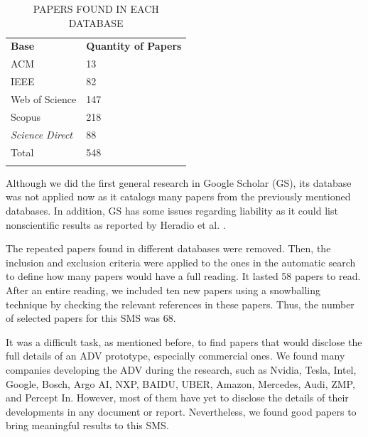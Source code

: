 \documentclass[lettersize,journal]{IEEEtran}
\begin{document}
\begin{table}[!ht]
  \centering
  \captionsetup{
    format=hang, %
    justification=raggedright,
    singlelinecheck=false,
    skip=9pt, %
  }
  \caption{\MakeUppercase{Papers found in each database}}
  \label{table:qtd_artigos}
  \def\arraystretch{1.5}
  \begin{tabularx}{\textwidth}{>{\centering\arraybackslash}X>{\centering\arraybackslash}X}
    \arrayrulecolor{white}
    \rowcolor{white}
    \textbf{Base} & \textbf{Quantity of Papers} \\
    \arrayrulecolor{cor_tabela} \hline
    ACM & \cellcolor{cor_tabela}13 \\
    \arrayrulecolor{cor_tabela} \hline
    IEEE & \cellcolor{cor_tabela}82 \\
    \arrayrulecolor{cor_tabela} \hline
    Web of Science & \cellcolor{cor_tabela}147 \\
    \arrayrulecolor{cor_tabela} \hline
    Scopus & \cellcolor{cor_tabela}218 \\
    \arrayrulecolor{cor_tabela} \hline
    \textit{Science Direct} & \cellcolor{cor_tabela}88 \\
    \arrayrulecolor{cor_tabela} \hline
    Total & \cellcolor{cor_destaque}548 \\
    \arrayrulecolor{cor_tabela} \hline
  \end{tabularx}
\end{table}




Although we did the first general research in Google Scholar (GS), its database was not applied now as it catalogs many papers from the previously mentioned databases. In addition, GS has some issues regarding liability as it could list nonscientific results as reported by Heradio et al. \cite{Heradio2018}. 

The repeated papers found in different databases were removed. Then, the inclusion and exclusion criteria were applied to the ones in the automatic search to define how many papers would have a full reading. It lasted 58 papers to read. After an entire reading, we included ten new papers using a snowballing technique by checking the relevant references in these papers. Thus, the number of selected papers for this SMS was 68.

It was a difficult task, as mentioned before, to find papers that would disclose the full details of an ADV prototype, especially commercial ones. We found many companies developing the ADV during the research, such as Nvidia, Tesla, Intel, Google, Bosch, Argo AI, NXP, BAIDU, UBER, Amazon, Mercedes, Audi, ZMP, and Percept In. However, most of them have yet to disclose the details of their developments in any document or report. Nevertheless, we found good papers to bring meaningful results to this SMS.
\end{document}
